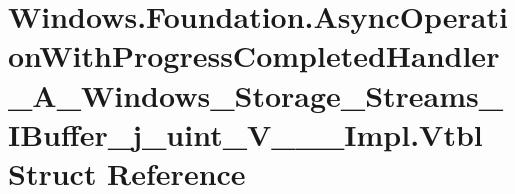 \hypertarget{struct_windows_1_1_foundation_1_1_async_operation_with_progress_completed_handler___a___windows_7e4a9a933abf5a83a91ddfaf1616265a}{}\section{Windows.\+Foundation.\+Async\+Operation\+With\+Progress\+Completed\+Handler\+\_\+\+A\+\_\+\+Windows\+\_\+\+Storage\+\_\+\+Streams\+\_\+\+I\+Buffer\+\_\+j\+\_\+uint\+\_\+\+V\+\_\+\+\_\+\+\_\+\+Impl.\+Vtbl Struct Reference}
\label{struct_windows_1_1_foundation_1_1_async_operation_with_progress_completed_handler___a___windows_7e4a9a933abf5a83a91ddfaf1616265a}
